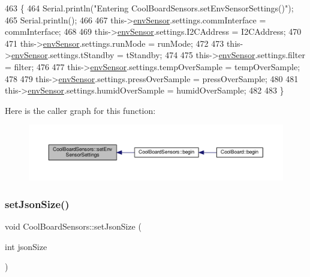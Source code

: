 \begin{DoxyCode}
463 \{
464     Serial.println(\textcolor{stringliteral}{"Entering CoolBoardSensors.setEnvSensorSettings()"});
465     Serial.println();
466   
467     this->\hyperlink{classCoolBoardSensors_a868e38985e9a2412829fa2790ca13e2e}{envSensor}.settings.commInterface = commInterface;      
468 
469     this->\hyperlink{classCoolBoardSensors_a868e38985e9a2412829fa2790ca13e2e}{envSensor}.settings.I2CAddress = I2CAddress;
470 
471     this->\hyperlink{classCoolBoardSensors_a868e38985e9a2412829fa2790ca13e2e}{envSensor}.settings.runMode = runMode; 
472 
473     this->\hyperlink{classCoolBoardSensors_a868e38985e9a2412829fa2790ca13e2e}{envSensor}.settings.tStandby = tStandby; 
474 
475     this->\hyperlink{classCoolBoardSensors_a868e38985e9a2412829fa2790ca13e2e}{envSensor}.settings.filter = filter; 
476 
477     this->\hyperlink{classCoolBoardSensors_a868e38985e9a2412829fa2790ca13e2e}{envSensor}.settings.tempOverSample = tempOverSample;
478 
479     this->\hyperlink{classCoolBoardSensors_a868e38985e9a2412829fa2790ca13e2e}{envSensor}.settings.pressOverSample = pressOverSample;
480 
481     this->\hyperlink{classCoolBoardSensors_a868e38985e9a2412829fa2790ca13e2e}{envSensor}.settings.humidOverSample = humidOverSample;
482 
483 \}
\end{DoxyCode}
Here is the caller graph for this function\+:\nopagebreak
\begin{figure}[H]
\begin{center}
\leavevmode
\includegraphics[width=350pt]{classCoolBoardSensors_a406307ffd70272282d91479c7ed8d66f_icgraph}
\end{center}
\end{figure}
\mbox{\label{classCoolBoardSensors_ab76e6dbd6efbcc25ff460535badd8d45}} 
\subsubsection{\texorpdfstring{set\+Json\+Size()}{setJsonSize()}}
{\footnotesize\ttfamily void Cool\+Board\+Sensors\+::set\+Json\+Size (\begin{DoxyParamCaption}\item[{int}]{json\+Size }\end{DoxyParamCaption})}

